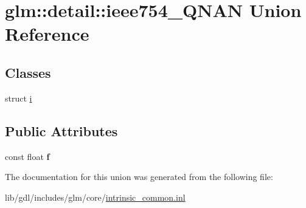 \hypertarget{unionglm_1_1detail_1_1ieee754___q_n_a_n}{}\section{glm\+:\+:detail\+:\+:ieee754\+\_\+\+Q\+N\+A\+N Union Reference}
\label{unionglm_1_1detail_1_1ieee754___q_n_a_n}
\subsection*{Classes}
\begin{DoxyCompactItemize}
\item 
struct \hyperlink{structglm_1_1detail_1_1ieee754___q_n_a_n_1_1i}{i}
\end{DoxyCompactItemize}
\subsection*{Public Attributes}
\begin{DoxyCompactItemize}
\item 
\hypertarget{unionglm_1_1detail_1_1ieee754___q_n_a_n_ac5f04f4e605e4d08ddc2bacddf7eee65}{}const float {\bfseries f}\label{unionglm_1_1detail_1_1ieee754___q_n_a_n_ac5f04f4e605e4d08ddc2bacddf7eee65}

\end{DoxyCompactItemize}


The documentation for this union was generated from the following file\+:\begin{DoxyCompactItemize}
\item 
lib/gdl/includes/glm/core/\hyperlink{intrinsic__common_8inl}{intrinsic\+\_\+common.\+inl}\end{DoxyCompactItemize}
